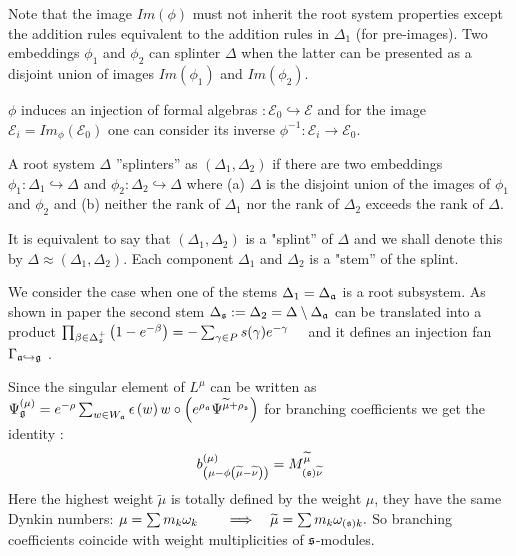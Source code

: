 Note that the image $Im(\phi)$ must not inherit the root system properties except the addition rules
equivalent to the addition rules in $\Delta_{1}$ (for pre-images). Two embeddings $\phi_1$ and
$\phi_2$ can splinter $\Delta$ when the latter can be presented as a disjoint union of images
$Im(\phi_1)$ and $Im(\phi_2)$.

$\phi$ induces an injection of formal algebras $:{\mathcal{E}}_0
\hookrightarrow \mathcal{E}$ and for the image ${\mathcal{E}}%
_i=Im_{\phi}\left( {\mathcal{E}}_0\right)$ one can consider its inverse $%
\phi^{-1}:{\mathcal{E}}_i \longrightarrow {\mathcal{E}}_0$.

\begin{Def}
  A root system $\Delta $ ''splinters'' as $(\Delta _{1},\Delta _{2})$ if there are two embeddings
  $\phi _{1}:\Delta _{1}\hookrightarrow \Delta $ and $%
  \phi _{2}:\Delta _{2}\hookrightarrow \Delta $ where (a) $\Delta $ is the disjoint union of the
  images of $\phi _{1}$ and $\phi _{2}$ and (b) neither the rank of $\Delta _{1}$ nor the rank of
  $\Delta _{2}$ exceeds the rank of $%
  \Delta $.
\end{Def}

It is equivalent to say that $(\Delta_1,\Delta_2)$ is a "splint'' of $\Delta$ and we shall denote
this by $\Delta \approx (\Delta_1,\Delta_2)$. Each component $\Delta_1$ and $\Delta_2$ is a "stem''
of the splint.

We consider the case when one of the stems $\Delta _{1}=\Delta _{\frak{a}}$ is a root subsystem. As shown in paper \cite{2011arXiv1111.6787L} the second stem $\Delta _{\frak{s}}:=\Delta
_{2}=\Delta \setminus \Delta _{\frak{a}}$ can be translated into a product
$\prod_{\beta \in \Delta _{\frak{s}}^{+}}\left( 1-e^{-\beta }\right)=-\sum_{\gamma \in P}s(\gamma )e^{-\gamma }\quad   \label{splint product}$
and it defines an injection fan $\Gamma _{\frak{a}%
\hookrightarrow \frak{g}}$ \cite{lyakhovsky1996rra,ilyin812pbc,2010arXiv1007.0318L}.

Since the singular element of $L^{\mu}$ can be
written as $\Psi _{\frak{g}}^{\left( \mu \right) }=e^{-\rho }
\sum_{w\in W_{\frak{a}}}\epsilon \left( w \right) w\circ \left(
e^{\rho _{\frak{a}}}\Psi ^{\widetilde{\mu }+\rho
_{\frak{s}}}\right)$  for branching coefficients we get the
identity \cite{2011arXiv1111.6787L}:
\begin{equation}
  \label{eq:146}
b_{\left( \mu -\phi \left( \widetilde{\mu }-\widetilde{\nu }\right) \right)
}^{(\mu )}=M_{\left( \frak{s}\right) \widetilde{\nu }}^{\widetilde{\mu }}  
\end{equation}
Here the highest weight $\widetilde{\mu }$ is totally defined by the weight $\mu $, they have the
same Dynkin numbers: $\mu =\sum m_{k}\omega _{k}\qquad \Longrightarrow \quad \widetilde{\mu }=\sum
m_{k}\omega_{(\mathfrak{s}) k} . \label{new h weight}$ So branching coefficients coincide with weight
multiplicities of $\mathfrak{s}$-modules.

